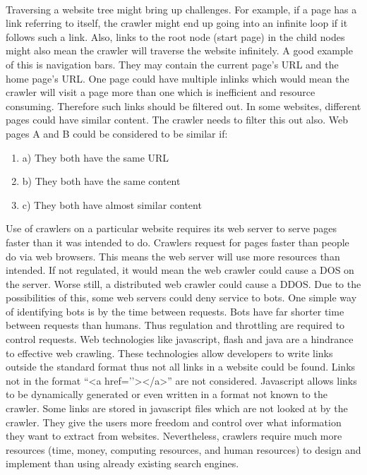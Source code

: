 \paragraph{}
Traversing a website tree might bring up challenges. For example, if a page has a link referring to itself, the crawler might end up going into an infinite loop if it follows such a link. Also, links to the root node (start page) in the child nodes might also mean the crawler will traverse the website infinitely. A good example of this is navigation bars. They may contain the current page’s URL and the home page’s URL. One page could have multiple inlinks which would mean the crawler will visit a page more than one which is inefficient and resource consuming. Therefore such links should be filtered out. In some websites, different pages could have similar content. The crawler needs to filter this out also. Web pages A and B could be considered to be similar if:
\begin{enumerate}
\item a) They both have the same URL
\item b) They both have the same content
\item c) They both have almost similar content
\end{enumerate}
Use of crawlers on a particular website requires its web server to serve pages faster than it was intended to do. Crawlers request for pages faster than people do via web browsers. This means the web server will use more resources than intended. If not regulated, it would mean the web crawler could cause a DOS on the server. Worse still, a distributed web crawler could cause a DDOS. Due to the possibilities of this, some web servers could deny service to bots. One simple way of identifying bots is by the time between requests. Bots have far shorter time between requests than humans. Thus regulation and throttling are required to control requests. Web technologies like javascript, flash and java are a hindrance to effective web crawling. These technologies allow developers to write links outside the standard format thus not all links in a website could be found. Links not in the format “<a href=’’></a>” are not considered. Javascript allows links to be dynamically generated or even written in a format not known to the crawler. Some links are stored in javascript files which are not looked at by the crawler. They give the users more freedom and control over what information they want to extract from websites. Nevertheless, crawlers require much more resources (time, money, computing resources, and human resources) to design and implement than using already existing search engines.

